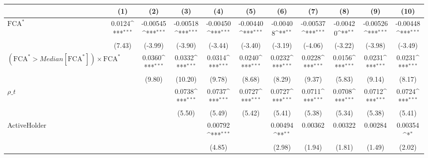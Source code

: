 {
\def\sym#1{\ifmmode^{#1}\else\(^{#1}\)\fi}
\begin{tabular}{l*{10}{c}}
\hline\hline
                    &\multicolumn{1}{c}{(1)}         &\multicolumn{1}{c}{(2)}         &\multicolumn{1}{c}{(3)}         &\multicolumn{1}{c}{(4)}         &\multicolumn{1}{c}{(5)}         &\multicolumn{1}{c}{(6)}         &\multicolumn{1}{c}{(7)}         &\multicolumn{1}{c}{(8)}         &\multicolumn{1}{c}{(9)}         &\multicolumn{1}{c}{(10)}         \\
\hline
$ \text{FCA}^* $    &      0.0124\sym{***}&    -0.00545\sym{***}&    -0.00518\sym{***}&    -0.00450\sym{***}&    -0.00440\sym{***}&    -0.00408\sym{**} &    -0.00537\sym{***}&    -0.00420\sym{**} &    -0.00526\sym{***}&    -0.00448\sym{***}\\
                    &      (7.43)         &     (-3.99)         &     (-3.90)         &     (-3.44)         &     (-3.40)         &     (-3.19)         &     (-4.06)         &     (-3.22)         &     (-3.98)         &     (-3.49)         \\
[1em]
 $ (\text{FCA}^* > Median[\text{FCA}^*]) \times {\text{FCA} ^*}  $ &                     &      0.0360\sym{***}&      0.0332\sym{***}&      0.0314\sym{***}&      0.0240\sym{***}&      0.0232\sym{***}&      0.0228\sym{***}&      0.0156\sym{***}&      0.0231\sym{***}&      0.0231\sym{***}\\
                    &                     &      (9.80)         &     (10.20)         &      (9.78)         &      (8.68)         &      (8.29)         &      (9.37)         &      (5.83)         &      (9.14)         &      (8.17)         \\
[1em]
$ \rho\_t $          &                     &                     &      0.0738\sym{***}&      0.0737\sym{***}&      0.0727\sym{***}&      0.0727\sym{***}&      0.0711\sym{***}&      0.0708\sym{***}&      0.0712\sym{***}&      0.0724\sym{***}\\
                    &                     &                     &      (5.50)         &      (5.49)         &      (5.42)         &      (5.41)         &      (5.38)         &      (5.34)         &      (5.38)         &      (5.41)         \\
[1em]
ActiveHolder        &                     &                     &                     &     0.00792\sym{***}&                     &     0.00494\sym{**} &     0.00362         &     0.00322         &     0.00284         &     0.00354\sym{*}  \\
                    &                     &                     &                     &      (4.85)         &                     &      (2.98)         &      (1.94)         &      (1.81)         &      (1.49)         &      (2.02)         \\

\end{tabular}}
